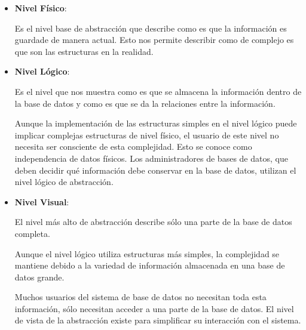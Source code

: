 \documentclass[12pt, fleqn]{report}                             %
\theoremstyle{break}                                            %
\begin{document}
            \begin{itemize}
                \item
                    \textbf{Nivel Físico}: 

                    Es el nivel base de abstracción que describe como es que la información
                    es guardade de manera actual. Esto nos permite describir como de complejo
                    es que son las estructuras en la realidad.

                \item
                    \textbf{Nivel Lógico}: 

                    Es el nivel que nos muestra como es que se almacena la información dentro de
                    la base de datos y como es que se da la relaciones entre la información.

                    Aunque la implementación de las estructuras simples en el nivel lógico puede
                    implicar complejas estructuras de nivel físico, el usuario de este nivel no
                    necesita ser consciente de esta complejidad.
                    Esto se conoce como independencia de datos físicos. 
                    Los administradores de bases de datos, que deben decidir qué información debe
                    conservar en la base de datos, utilizan el nivel lógico de abstracción.

                \item
                    \textbf{Nivel Visual}: 

                    El nivel más alto de abstracción describe sólo una parte de la base de datos completa.

                    Aunque el nivel lógico utiliza estructuras más simples, la complejidad se mantiene
                    debido a la variedad de información almacenada en una base de datos grande.

                    Muchos usuarios del sistema de base de datos no necesitan toda esta información, 
                    sólo necesitan acceder a una parte de la base de datos.
                    El nivel de vista de la abstracción existe para simplificar su interacción
                    con el sistema.

            \end{itemize}



        \clearpage
\end{document}
